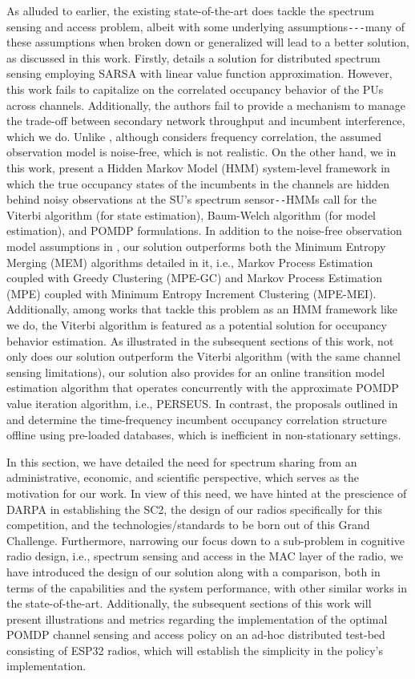 As alluded to earlier, the existing state-of-the-art does tackle the spectrum sensing and access problem, albeit with some underlying assumptions\texttt{-{-}-}many of these assumptions when broken down or generalized will lead to a better solution, as discussed in this work. Firstly, \cite{WCL:5} details a solution for distributed spectrum sensing employing SARSA with linear value function approximation. However, this work fails to capitalize on the correlated occupancy behavior of the PUs across channels. Additionally, the authors fail to provide a mechanism to manage the trade-off between secondary network throughput and incumbent interference, which we do. Unlike \cite{WCL:5}, although \cite{WCL:7} considers frequency correlation, the assumed observation model is noise-free, which is not realistic. On the other hand, we in this work, present a Hidden Markov Model (HMM) system-level framework in which the true occupancy states of the incumbents in the channels are hidden behind noisy observations at the SU's spectrum sensor\texttt{-{}-}HMMs call for the Viterbi algorithm (for state estimation), Baum-Welch algorithm (for model estimation), and POMDP formulations. In addition to the noise-free observation model assumptions in \cite{WCL:7}, our solution outperforms both the Minimum Entropy Merging (MEM) algorithms detailed in it, i.e., Markov Process Estimation coupled with Greedy Clustering (MPE-GC) and Markov Process Estimation (MPE) coupled with Minimum Entropy Increment Clustering (MPE-MEI). Additionally, among works that tackle this problem as an HMM framework \cite{WCL:6} like we do, the Viterbi algorithm is featured as a potential solution for occupancy behavior estimation. As illustrated in the subsequent sections of this work, not only does our solution outperform the Viterbi algorithm (with the same channel sensing limitations), our solution also provides for an online transition model estimation algorithm that operates concurrently with the approximate POMDP value iteration algorithm, i.e., PERSEUS. In contrast, the proposals outlined in \cite{WCL:6} and \cite{WCL:7} determine the time-frequency incumbent occupancy correlation structure offline using pre-loaded databases, which is inefficient in non-stationary settings.

In this section, we have detailed the need for spectrum sharing from an administrative, economic, and scientific perspective, which serves as the motivation for our work. In view of this need, we have hinted at the prescience of DARPA in establishing the SC2, the design of our radios specifically for this competition, and the technologies/standards to be born out of this Grand Challenge. Furthermore, narrowing our focus down to a sub-problem in cognitive radio design, i.e., spectrum sensing and access in the MAC layer of the radio, we have introduced the design of our solution along with a comparison, both in terms of the capabilities and the system performance, with other similar works in the state-of-the-art. Additionally, the subsequent sections of this work will present illustrations and metrics regarding the implementation of the optimal POMDP channel sensing and access policy on an ad-hoc distributed test-bed consisting of ESP32 radios, which will establish the simplicity in the policy's implementation.

